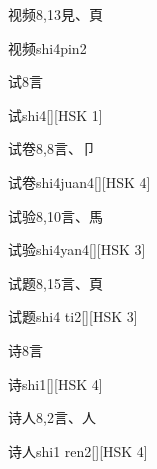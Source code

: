 \begin{entry}{视频}{8,13}{⾒、⾴}
  \begin{phonetics}{视频}{shi4pin2}
  \end{phonetics}
\end{entry}

\begin{entry}{试}{8}{⾔}
  \begin{phonetics}{试}{shi4}[][HSK 1]
  \end{phonetics}
\end{entry}

\begin{entry}{试卷}{8,8}{⾔、⼙}
  \begin{phonetics}{试卷}{shi4juan4}[][HSK 4]
  \end{phonetics}
\end{entry}

\begin{entry}{试验}{8,10}{⾔、⾺}
  \begin{phonetics}{试验}{shi4yan4}[][HSK 3]
  \end{phonetics}
\end{entry}

\begin{entry}{试题}{8,15}{⾔、⾴}
  \begin{phonetics}{试题}{shi4 ti2}[][HSK 3]
  \end{phonetics}
\end{entry}

\begin{entry}{诗}{8}{⾔}
  \begin{phonetics}{诗}{shi1}[][HSK 4]
  \end{phonetics}
\end{entry}

\begin{entry}{诗人}{8,2}{⾔、⼈}
  \begin{phonetics}{诗人}{shi1 ren2}[][HSK 4]
  \end{phonetics}
\end{entry}

